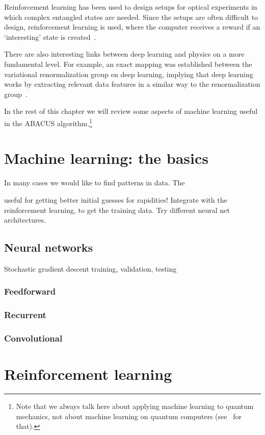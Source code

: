 \documentclass[11pt, a4paper]{report} %
\begin{document}
Reinforcement learning has been used to design setups for optical experiments in which complex entangled states are needed.
Since the setups are often difficult to design, reinforcement learning is used, where the computer receives a reward if an `interesting' state is created~\cite{dunjko17_machin_learn_artif_intel_quant_domain}.

There are also interesting links between deep learning and physics on a more fundamental level.
For example, an exact mapping was established between the variational renormalization group en deep learning, implying that deep learning works by extracting relevant data features in a similar way to the renormalization group~\cite{Mehta2014}. 

In the rest of this chapter we will review some aspects of machine learning useful in the ABACUS algorithm.\footnote{Note that we always talk here about applying machine learning to quantum mechanics, not about machine learning on quantum computers (see~\cite{Dunjko2017} for that).}


\section{Machine learning: the basics}
In many cases we would like to find patterns in data.
The 

useful for getting better initial guesses for rapidities!
Integrate with the reinforcement learning, to get the training data. Try different neural net architectures.
\subsection{Neural networks}
Stochastic gradient descent
training, validation, testing
\subsubsection{Feedforward}
\subsubsection{Recurrent}
\subsubsection{Convolutional}



\section{Reinforcement learning}
\end{document}

